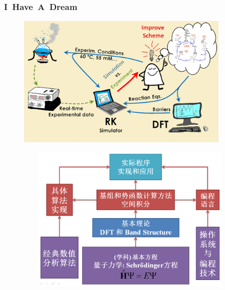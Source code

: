 \small
\frame
{
	\frametitle{\rm{I~Have~A~Dream}}
\begin{figure}[h!]
\vspace*{-0.18in}
\centering
\includegraphics[height=2.55in,width=4.05in]{Figures/Schematic_Material-Design.png}
\label{Schematic_Material-Design}
\end{figure} 
}

\frame
{
\begin{figure}[h!]
\vspace*{-0.25in}
\centering
\includegraphics[height=2.80in,width=4.95in,viewport=5 3 1250 780,clip]{Figures/Method_Procedure.png}
\label{Method-Procedure}
\end{figure}
}

